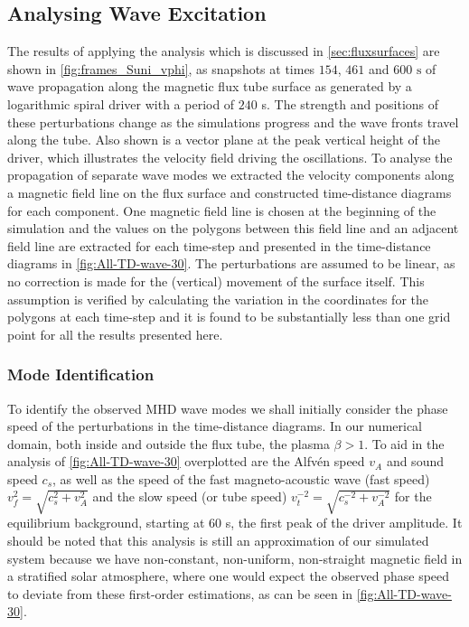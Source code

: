 \subsection{Analysing Wave Excitation}\label{sec:driveranalysis}
The results of applying the analysis which is discussed in \cref{sec:fluxsurfaces} are shown in \cref{fig:frames_Suni_vphi}, as snapshots at times $154$, $461$ and $600 \text{ s}$ of wave propagation along the magnetic flux tube surface as generated by a logarithmic spiral driver with a period of $240$ s.
The strength and positions of these perturbations change as the simulations progress and the wave fronts travel along the tube. 
Also shown is a vector plane at the peak vertical height of the driver, which illustrates the velocity field driving the oscillations.
To analyse the propagation of separate wave modes we extracted the velocity components along a magnetic field line on the flux surface and constructed time-distance diagrams for each component. 
One magnetic field line is chosen at the beginning of the simulation and the values on the polygons between this field line and an adjacent field line are extracted for each time-step and presented in the time-distance diagrams in \cref{fig:All-TD-wave-30}. 
The perturbations are assumed to be linear, as no correction is made for the (vertical) movement of the surface itself. 
This assumption is verified by calculating the variation in the coordinates for the polygons at each time-step and it is found to be substantially less than one grid point for all the results presented here.


\subsubsection{Mode Identification}
To identify the observed MHD wave modes we shall initially consider the phase speed of the perturbations in the time-distance diagrams. 
In our numerical domain, both inside and outside the flux tube, the plasma $\beta > 1$.
To aid in the analysis of \cref{fig:All-TD-wave-30} overplotted are the Alfv\'en speed $v_A$ and sound speed $c_s$, as well as the speed of the fast magneto-acoustic wave (fast speed) $v_f^2 = \sqrt{c_s^2 + v_A^2}$ and the slow speed (or tube speed) $v_t^{-2} = \sqrt{c_s^{-2} + v_A^{-2}}$ for the equilibrium background, starting at $60$ s, the first peak of the driver amplitude. 
It should be noted that this analysis is still an approximation of our simulated system because we have non-constant, non-uniform, non-straight magnetic field in a stratified solar atmosphere, where one would expect the observed phase speed to deviate from these first-order estimations, as can be seen in \cref{fig:All-TD-wave-30}.

